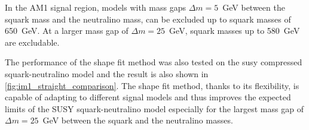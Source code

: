 In the AM1 signal region, models with mass gaps $\Delta m = 5$~GeV between the
squark mass and the neutralino mass, can be excluded up to squark masses of
650~GeV. At a larger mass gap of $\Delta m = 25$~GeV, squark masses up to
580~GeV are excludable.

The performance of the shape fit method was also tested on the \gls{susy}
compressed squark-neutralino model and the result is also shown in
\cref{fig:im1_straight_comparison}. The shape fit method, thanks to its
flexibility, is capable of adapting to different signal models and thus improves
the expected limits of the SUSY squark-neutralino model especially for the
largest mass gap of $\Delta m = 25$~GeV between the squark and the neutralino
masses.  \pagebreak[4]
